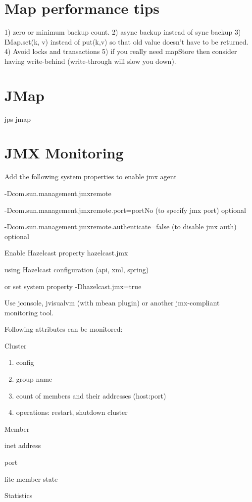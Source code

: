 \section{Map performance tips}

1) zero or minimum backup count.
2) async backup instead of sync backup
3) IMap.set(k, v) instead of put(k,v) so that old value doesn't have
to be returned.
4) Avoid locks and transactions
5) if you really need mapStore then consider having write-behind
(write-through will slow you down).

\section{JMap}

jps
jmap

\section{JMX Monitoring}

Add the following system properties to enable jmx agent

-Dcom.sun.management.jmxremote

-Dcom.sun.management.jmxremote.port=portNo (to specify jmx port) optional

-Dcom.sun.management.jmxremote.authenticate=false (to disable jmx auth) optional

Enable Hazelcast property hazelcast.jmx

using Hazelcast configuration (api, xml, spring)

or set system property -Dhazelcast.jmx=true

Use jconsole, jvisualvm (with mbean plugin) or another jmx-compliant monitoring tool.

Following attributes can be monitored:


Cluster
\begin{enumerate}
\item config
\item group name
\item count of members and their addresses (host:port)
\item operations: restart, shutdown cluster
\end{enumerate}

Member

inet address

port

lite member state

Statistics

